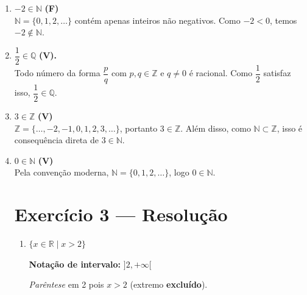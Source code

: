 \documentclass[12pt, a4paper]{article}
\begin{document}
\begin{enumerate}[label=(\alph*)]
 
    \item $-2 \in \mathbb{N}$ \quad \textbf{(F)}\\
    
    $\mathbb{N} = \{0, 1, 2, \ldots\}$ contém apenas inteiros não negativos.
    Como $-2 < 0$, temos $-2 \notin \mathbb{N}$.
    
 
    \item $\dfrac{1}{2} \in \mathbb{Q}$ \quad \textbf{(V).}\\
    
    Todo número da forma $\dfrac{p}{q}$ com $p, q \in \mathbb{Z}$ e $q \neq 0$
    é racional. Como $\dfrac{1}{2}$ satisfaz isso, $\dfrac{1}{2} \in \mathbb{Q}$.
    
 
    \item $3 \in \mathbb{Z}$ \quad \textbf{(V)}\\
    
    $\mathbb{Z} = \{\ldots, -2, -1, 0, 1, 2, 3, \ldots\}$, portanto $3 \in \mathbb{Z}$.
    Além disso, como $\mathbb{N} \subset \mathbb{Z}$, isso é consequência direta
    de $3 \in \mathbb{N}$.
    
 
    \item $0 \in \mathbb{N}$ \quad \textbf{(V)}\\
    
    Pela convenção moderna, $\mathbb{N} = \{0, 1, 2, \ldots\}$,
    logo $0 \in \mathbb{N}$.
\pagebreak

\section*{Exercício 3 — Resolução}
 
\begin{enumerate}[label=(\alph*)]
 
    \item $\{x \in \mathbb{R} \mid x > 2\}$
 
    \textbf{Notação de intervalo:} $]2, +\infty[$
 
    \textit{Parêntese} em 2 pois $x > 2$ (extremo \textbf{excluído}).
 
    \begin{center}
    \end{center}
 

\end{enumerate}
\end{enumerate}
\end{document}
